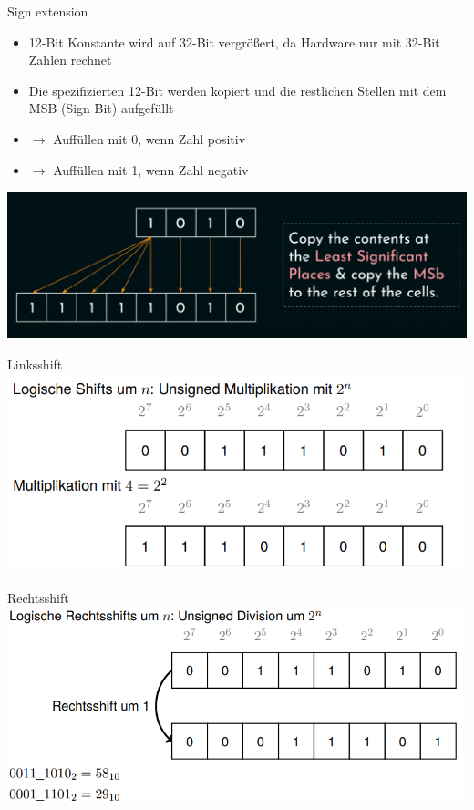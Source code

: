 \documentclass[
  german,            %
  aspectratio=169,    %
]{tumbeamer}
\begin{document}
\begin{frame}[c]{Sign extension}{}
  \begin{minipage}[t]{\textwidth}
    \vspace{0.2cm} %
    \begin{itemize}
      \item 12-Bit Konstante wird auf 32-Bit vergrößert, da Hardware nur mit 32-Bit Zahlen rechnet
      \item Die spezifizierten 12-Bit werden kopiert und die restlichen Stellen mit dem MSB (Sign Bit) aufgefüllt
      \item $\rightarrow$ Auffüllen mit 0, wenn Zahl positiv
      \item $\rightarrow$ Auffüllen mit 1, wenn Zahl negativ
    \end{itemize}
  \end{minipage}

  \vfill %

  \begin{minipage}[b]{\textwidth}
    \centering
    \includegraphics[width=0.75\linewidth]{signextension.png}
  \end{minipage}
\end{frame}

\begin{frame}[c]{Linksshift}{}
  \centering
  \includegraphics[width=0.75\linewidth]{unsiged_leftshift.png}
\end{frame}

\begin{frame}[c]{Rechtsshift}{}
  \centering
  \includegraphics[width=0.75\linewidth]{unsigned_rightshift.png}
\end{frame}
\end{document}
